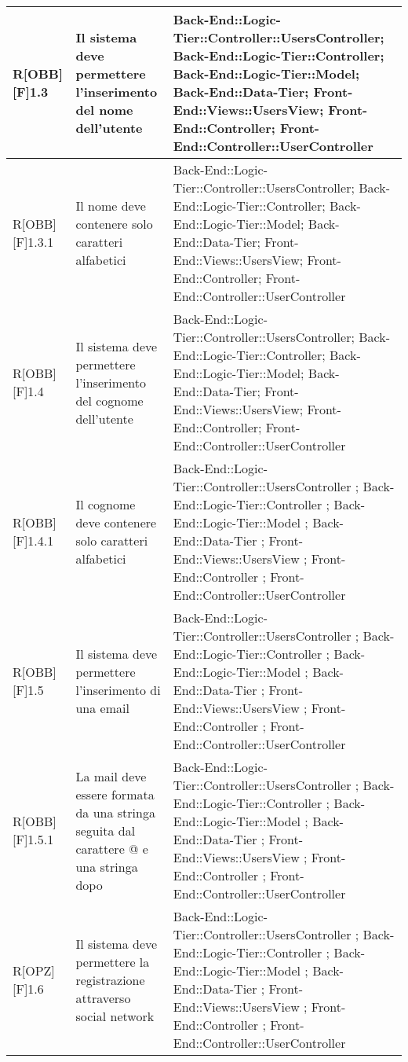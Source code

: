 	\begin{table}[h]
		\begin{tabular}{|p{}|p{}|p{}|}
			\midrule
			R[OBB][F]1.3 & Il sistema deve permettere l'inserimento del nome dell'utente & Back-End::Logic-Tier::Controller::UsersController; Back-End::Logic-Tier::Controller; Back-End::Logic-Tier::Model; Back-End::Data-Tier; Front-End::Views::UsersView; Front-End::Controller; Front-End::Controller::UserController \\ \midrule
			R[OBB][F]1.3.1 & Il nome deve contenere solo caratteri alfabetici & Back-End::Logic-Tier::Controller::UsersController; Back-End::Logic-Tier::Controller; Back-End::Logic-Tier::Model; Back-End::Data-Tier; Front-End::Views::UsersView; Front-End::Controller; Front-End::Controller::UserController \\ \midrule
			R[OBB][F]1.4 & Il sistema deve permettere l'inserimento del cognome dell'utente & Back-End::Logic-Tier::Controller::UsersController; Back-End::Logic-Tier::Controller; Back-End::Logic-Tier::Model; Back-End::Data-Tier; Front-End::Views::UsersView; Front-End::Controller; Front-End::Controller::UserController \\ \midrule
			R[OBB][F]1.4.1 & Il cognome deve contenere solo caratteri alfabetici & Back-End::Logic-Tier::Controller::UsersController ; Back-End::Logic-Tier::Controller ; Back-End::Logic-Tier::Model ; Back-End::Data-Tier ; Front-End::Views::UsersView ; Front-End::Controller ; Front-End::Controller::UserController \\ \midrule
			R[OBB][F]1.5 & Il sistema deve permettere l'inserimento di una email & Back-End::Logic-Tier::Controller::UsersController ; Back-End::Logic-Tier::Controller ; Back-End::Logic-Tier::Model ; Back-End::Data-Tier ; Front-End::Views::UsersView ; Front-End::Controller ; Front-End::Controller::UserController \\ \midrule
			R[OBB][F]1.5.1 & La mail deve essere formata da una stringa seguita dal carattere @ e una stringa dopo & Back-End::Logic-Tier::Controller::UsersController ; Back-End::Logic-Tier::Controller ; Back-End::Logic-Tier::Model ; Back-End::Data-Tier ; Front-End::Views::UsersView ; Front-End::Controller ; Front-End::Controller::UserController \\ \midrule
			R[OPZ][F]1.6 & Il sistema deve permettere la registrazione attraverso social network & Back-End::Logic-Tier::Controller::UsersController ; Back-End::Logic-Tier::Controller ; Back-End::Logic-Tier::Model ; Back-End::Data-Tier ; Front-End::Views::UsersView ; Front-End::Controller ; Front-End::Controller::UserController \\ \midrule

\end{tabular}
\end{table}
